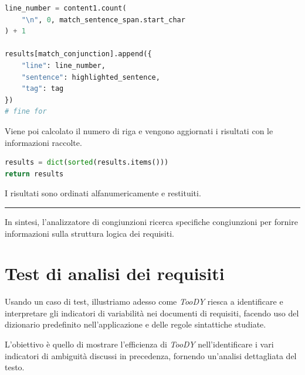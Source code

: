 \documentclass[12pt]{report}
\newcommand{\toody}{\textsl{TooDY}\xspace}
\begin{document}
\begin{mdframed}
\small
\begin{lstlisting}[language=Python]
line_number = content1.count(
    "\n", 0, match_sentence_span.start_char
) + 1

results[match_conjunction].append({
    "line": line_number,
    "sentence": highlighted_sentence,
    "tag": tag
})
# fine for
\end{lstlisting}
\end{mdframed}

\noindent Viene poi calcolato il numero di riga e vengono aggiornati i risultati con le informazioni raccolte.


\begin{mdframed}
\small
\begin{lstlisting}[language=Python]
results = dict(sorted(results.items()))
return results
\end{lstlisting}
\end{mdframed}

\noindent I risultati sono ordinati alfanumericamente e restituiti.


{\centering \rule{0.5\linewidth}{0.1pt} \par\vspace{0.25cm}}

In sintesi, l'\textsf{analizzatore di congiunzioni} ricerca specifiche congiunzioni per fornire informazioni sulla struttura logica dei requisiti.


\section{Test di analisi dei requisiti}
Usando un caso di test, illustriamo adesso come \toody riesca a identificare e interpretare gli indicatori di variabilità nei documenti di requisiti, facendo uso del dizionario predefinito nell'applicazione e delle regole sintattiche studiate.

L'obiettivo è quello di mostrare l'efficienza di \toody nell'identificare i vari indicatori di ambiguità discussi in precedenza, fornendo un'analisi dettagliata del testo.


\newpage
\end{document}
